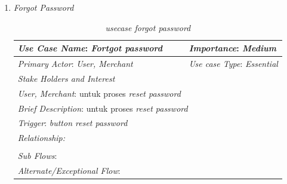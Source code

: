 \documentclass[a4paper]{article}
\begin{document}
\begin{enumerate}
\begin{enumerate}
        \item \textit{Forgot Password}
\begin{table}[h]
    \centering
    \begin{tabular}{|lll}
    \hline
    \multicolumn{1}{|l|}{\textit{Use Case Name}: \textit{Fortgot password}}             & \multicolumn{2}{l|}{\textit{Importance}: \textit{Medium}}   \\ \hline
    \multicolumn{1}{|l|}{\textit{Primary Actor}: \textit{User, Merchant}}             & \multicolumn{2}{l|}{\textit{Use case Type}: \textit{Essential}} \\ \hline
    \multicolumn{1}{|l|}{\textit{Stake Holders and Interest}} &                               &                               \\ \cline{1-1}
    \multicolumn{1}{|l|}{\textit{User, Merchant}: untuk proses \textit{reset password}}                                                     &                               &                               \\ \hline
    \multicolumn{3}{|l|}{\textit{Brief Description}: untuk proses \textit{reset password}}                                                                         \\ \hline
    \multicolumn{3}{|l|}{\textit{Trigger}: \textit{button reset password}}                                                                                   \\ \hline
    \multicolumn{3}{|l|}{\textit{Relationship:}}                                                                              \\ \hline
    \multicolumn{3}{|l|}{}                                                                                                                     \\ \hline
    \multicolumn{3}{|l|}{\textit{Sub Flows}:}                                                                                 \\ \hline
    \multicolumn{3}{|l|}{\textit{Alternate/Exceptional Flow}:}                                                                \\ \hline
    \end{tabular}
    \caption{\textit{usecase forgot password} }
\end{table}

        \newpage


\end{enumerate}
\end{enumerate}
\end{document}
